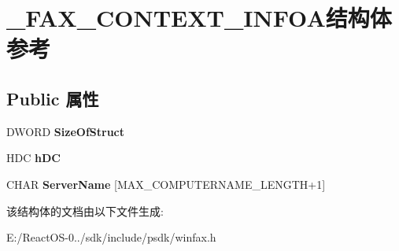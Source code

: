 \hypertarget{struct___f_a_x___c_o_n_t_e_x_t___i_n_f_o_a}{}\section{\+\_\+\+F\+A\+X\+\_\+\+C\+O\+N\+T\+E\+X\+T\+\_\+\+I\+N\+F\+O\+A结构体 参考}
\label{struct___f_a_x___c_o_n_t_e_x_t___i_n_f_o_a}
\subsection*{Public 属性}
\begin{DoxyCompactItemize}
\item 
\mbox{\label{struct___f_a_x___c_o_n_t_e_x_t___i_n_f_o_a_ada16e006018b79b343efdaa9552b89e4}} 
D\+W\+O\+RD {\bfseries Size\+Of\+Struct}
\item 
\mbox{\label{struct___f_a_x___c_o_n_t_e_x_t___i_n_f_o_a_a5d00e93206af67cd49acac21a651f8ad}} 
H\+DC {\bfseries h\+DC}
\item 
\mbox{\label{struct___f_a_x___c_o_n_t_e_x_t___i_n_f_o_a_a8541fd414fa05b24c5a40efeb1f0f7f1}} 
C\+H\+AR {\bfseries Server\+Name} \mbox{[}M\+A\+X\+\_\+\+C\+O\+M\+P\+U\+T\+E\+R\+N\+A\+M\+E\+\_\+\+L\+E\+N\+G\+TH+1\mbox{]}
\end{DoxyCompactItemize}


该结构体的文档由以下文件生成\+:\begin{DoxyCompactItemize}
\item 
E\+:/\+React\+O\+S-\/0../sdk/include/psdk/winfax.\+h\end{DoxyCompactItemize}
